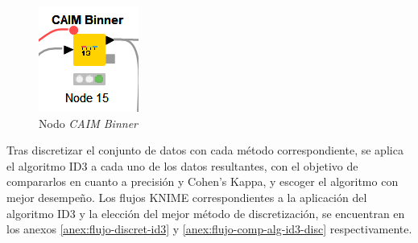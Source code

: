 \begin{figure}[H]
	\centering
	\includegraphics[width=0.15\linewidth]{"figuras/capi 2/caim-binner-nodo"}
	\caption[Nodo CAIM Binner]{Nodo \textit{CAIM Binner}}
	\label{fig:caim-binner-nodo}
\end{figure}

Tras discretizar el conjunto de datos con cada método correspondiente, se aplica el algoritmo ID3 a cada uno de los datos resultantes, con el objetivo de compararlos en cuanto a precisión y Cohen's Kappa, y escoger el algoritmo con mejor desempeño. Los flujos KNIME correspondientes a la aplicación del algoritmo ID3 y la elección del mejor método de discretización, se encuentran en los anexos \ref{anex:flujo-discret-id3} y \ref{anex:flujo-comp-alg-id3-disc} respectivamente. 


